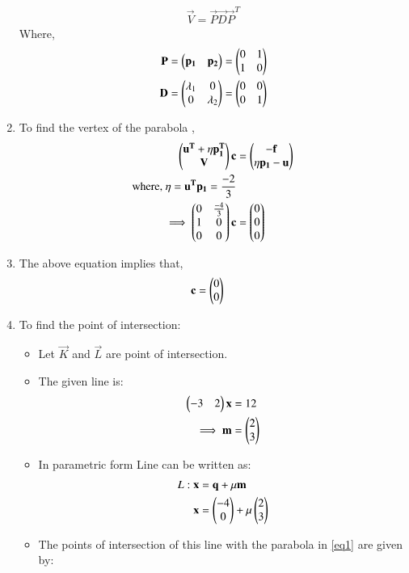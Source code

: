 \documentclass[journal,12pt,twocolumn]{IEEEtran}
\begin{document}
\begin{enumerate}
\begin{align}
\vec{V}=\vec{P}\vec{D}\vec{P}^T
\end{align}
Where,
\begin{align}
\mathbf{P} &= \begin{pmatrix}\mathbf{p_1} & \mathbf{p_2}\end{pmatrix} = \begin{pmatrix}0 & 1 \\ 1 & 0\end{pmatrix}
\\
\mathbf{D} &= \begin{pmatrix}\lambda_1 & 0 \\ 0 & \lambda_2\end{pmatrix} =\begin{pmatrix}0 & 0 \\ 0 & 1\end{pmatrix} 
\end{align}
\item To find the vertex of the parabola ,
\begin{align} \begin{pmatrix}\mathbf{u^T}+\eta\mathbf{p_1^T}\\\mathbf{V} \end{pmatrix}\mathbf{c} &= \begin{pmatrix}\mathbf{-f}\\\eta \mathbf{p_1} -\mathbf{u}\end{pmatrix}
\\
\text{where, }  \eta = \mathbf{u^T}\mathbf{p_1} = \frac{-2}{3}
\\
\implies\begin{pmatrix}0 & \frac{-4}{3}\\1 & 0 \\0 & 0\end{pmatrix} \mathbf{c}&= \begin{pmatrix}0\\0\\0\end{pmatrix}
\end{align}
\item The above equation implies that,
\begin{align}    
   \mathbf{c} &= \begin{pmatrix}0 \\ 0\end{pmatrix}
\end{align}
\item To find the point of intersection:
\begin{itemize}
    \item Let $\vec{K}$ and $\vec{L}$ are point of intersection.
    \item The given line is:
\begin{align} 
\begin{pmatrix}-3&2\end{pmatrix}\mathbf{x}&=12
\\
\implies \mathbf{m}&=\begin{pmatrix}2\\3\end{pmatrix}
\end{align}
\item In parametric form Line can be written as:
\begin{align} 
L: \mathbf{x}&=\mathbf{q}+\mu\mathbf{m}
\\
\mathbf{x}&=\begin{pmatrix}-4\\0\end{pmatrix}+\mu\begin{pmatrix}2\\3\end{pmatrix} \label{eq:Line}
\end{align}
\item The points of intersection of this line with the parabola in \eqref{eq1} are given by:

\end{itemize}
\end{enumerate}
\end{document}
